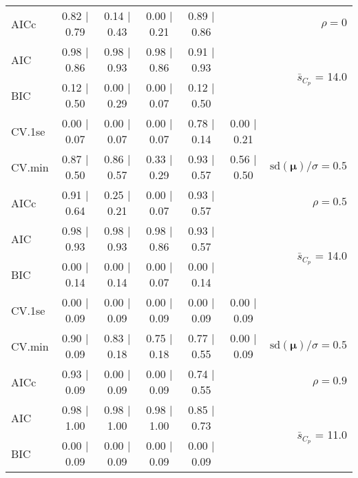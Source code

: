 \documentclass[12pt]{article}
\newcommand{\mr}[1]{\mathrm{#1}}
\newcommand{\bm}[1]{\mathbf{#1}}
\begin{document}
\begin{table}[p]
\begin{center}
\begin{tabular}{l*{5}{c}|r}
AICc & 0.82 $\mid$ 0.79 & 0.14 $\mid$ 0.43 & 0.00 $\mid$ 0.21 & 0.89 $\mid$ 0.86 & & $\rho=0$ \\
AIC & 0.98 $\mid$ 0.86 & 0.98 $\mid$ 0.93 & 0.98 $\mid$ 0.86 & 0.91 $\mid$ 0.93 & & \multirow{2}{*}{$\bar{s}_{C_p}$ = 14.0} \\
BIC & 0.12 $\mid$ 0.50 & 0.00 $\mid$ 0.29 & 0.00 $\mid$ 0.07 & 0.12 $\mid$ 0.50 & & \\
 \hline 
CV.1se & 0.00 $\mid$ 0.07 & 0.00 $\mid$ 0.07 & 0.00 $\mid$ 0.07 & 0.78 $\mid$ 0.14 & 0.00 $\mid$ 0.21 &\\
CV.min & 0.87 $\mid$ 0.50 & 0.86 $\mid$ 0.57 & 0.33 $\mid$ 0.29 & 0.93 $\mid$ 0.57 & 0.56 $\mid$ 0.50 &  $\mr{sd}(\bm{\mu})/\sigma=0.5$ \\
AICc & 0.91 $\mid$ 0.64 & 0.25 $\mid$ 0.21 & 0.00 $\mid$ 0.07 & 0.93 $\mid$ 0.57 & & $\rho=0.5$ \\
AIC & 0.98 $\mid$ 0.93 & 0.98 $\mid$ 0.93 & 0.98 $\mid$ 0.86 & 0.93 $\mid$ 0.57 & & \multirow{2}{*}{$\bar{s}_{C_p}$ = 14.0} \\
BIC & 0.00 $\mid$ 0.14 & 0.00 $\mid$ 0.14 & 0.00 $\mid$ 0.07 & 0.00 $\mid$ 0.14 & & \\
 \hline 
CV.1se & 0.00 $\mid$ 0.09 & 0.00 $\mid$ 0.09 & 0.00 $\mid$ 0.09 & 0.00 $\mid$ 0.09 & 0.00 $\mid$ 0.09 &\\
CV.min & 0.90 $\mid$ 0.09 & 0.83 $\mid$ 0.18 & 0.75 $\mid$ 0.18 & 0.77 $\mid$ 0.55 & 0.00 $\mid$ 0.09 &  $\mr{sd}(\bm{\mu})/\sigma=0.5$ \\
AICc & 0.93 $\mid$ 0.09 & 0.00 $\mid$ 0.09 & 0.00 $\mid$ 0.09 & 0.74 $\mid$ 0.55 & & $\rho=0.9$ \\
AIC & 0.98 $\mid$ 1.00 & 0.98 $\mid$ 1.00 & 0.98 $\mid$ 1.00 & 0.85 $\mid$ 0.73 & & \multirow{2}{*}{$\bar{s}_{C_p}$ = 11.0} \\
BIC & 0.00 $\mid$ 0.09 & 0.00 $\mid$ 0.09 & 0.00 $\mid$ 0.09 & 0.00 $\mid$ 0.09 & & \\
 \hline 
 \end{tabular}
\end{center}
\vspace{-1cm}
\end{table}
\end{document}
